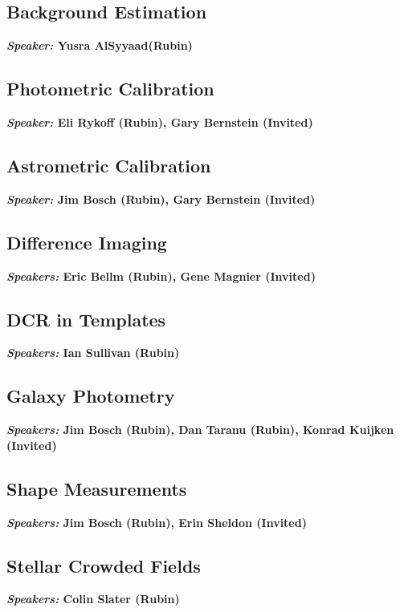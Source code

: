 \documentclass[DM,authoryear,toc]{lsstdoc}
\begin{document}
\subsection{Background Estimation}
 \textbf{ \textit{Speaker:} Yusra AlSyyaad(Rubin) } 

\subsection{Photometric Calibration}
 \textbf{ \textit{Speaker:} Eli Rykoff (Rubin),  Gary Bernstein  (Invited)  } 

\subsection{Astrometric Calibration}
 \textbf{ \textit{Speaker:} Jim  Bosch (Rubin), Gary Bernstein (Invited)  } 

\subsection{Difference Imaging}
 \textbf{ \textit{Speakers:} Eric Bellm (Rubin), Gene Magnier (Invited)  } 

\subsection{DCR in Templates}
 \textbf{ \textit{Speakers:} Ian Sullivan (Rubin) } 
  
 \subsection{Galaxy Photometry}
 \textbf{ \textit{Speakers:} Jim  Bosch (Rubin), Dan Taranu (Rubin), Konrad Kuijken (Invited)  } 

  \subsection{Shape  Measurements }
   \textbf{ \textit{Speakers:} Jim  Bosch (Rubin),  Erin  Sheldon  (Invited)  } 
  
  \subsection{Stellar Crowded Fields}
 \textbf{ \textit{Speakers:} Colin Slater  (Rubin) } 
\end{document}
